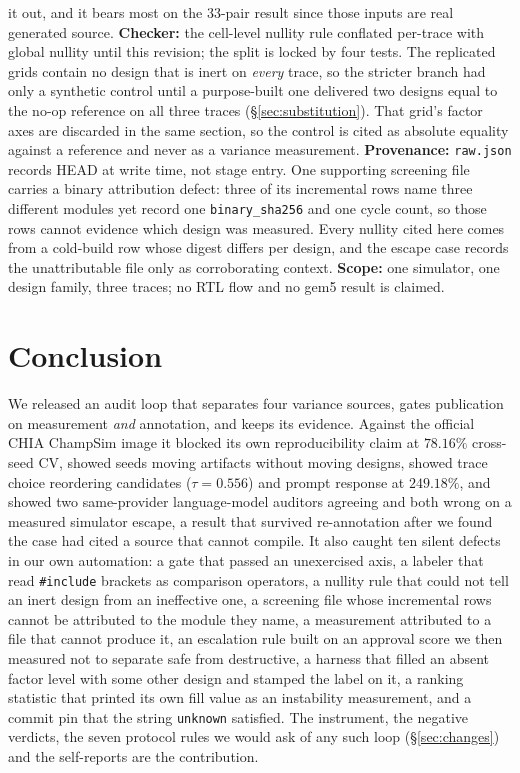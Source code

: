 \documentclass[10pt,twocolumn]{article}
\begin{document}
it out, and it bears most on the 33-pair result since those inputs are real generated
source. \textbf{Checker:} the
cell-level nullity rule conflated per-trace with global nullity until this revision;
the split is locked by four tests. The replicated grids contain no design that is inert
on \emph{every} trace, so the stricter branch had only a synthetic control until a
purpose-built one delivered two designs equal to the no-op reference on all three
traces (\S\ref{sec:substitution}). That grid's factor axes are discarded in the same
section, so the control is cited as absolute equality against a reference and never as
a variance measurement.
\textbf{Provenance:} \texttt{raw.json} records HEAD at write time, not stage entry.
One supporting screening file carries a binary attribution defect: three of its
incremental rows name three different modules yet record one \texttt{binary\_sha256}
and one cycle count, so those rows cannot evidence which design was measured. Every
nullity cited here comes from a cold-build row whose digest differs per design, and
the escape case records the unattributable file only as corroborating context.
\textbf{Scope:} one simulator, one design
family, three traces; no RTL flow and no gem5 result is claimed.

\section{Conclusion}
We released an audit loop that separates four variance sources, gates publication
on measurement \emph{and} annotation, and keeps its evidence. Against the
official CHIA ChampSim image it blocked its own reproducibility claim at
$78.16\%$ cross-seed CV, showed seeds moving artifacts without moving designs,
showed trace choice reordering candidates ($\tau=0.556$) and prompt response at
$249.18\%$, and showed two same-provider language-model auditors agreeing and both
wrong on a measured simulator escape, a result that survived re-annotation after we
found the case had cited a source that cannot compile. It also caught ten silent defects
in our own automation: a gate that passed an unexercised axis, a labeler that read
\texttt{\#include} brackets as comparison operators, a nullity rule that could not tell
an inert design from an ineffective one, a screening file whose incremental rows cannot
be attributed to the module they name, a measurement attributed to a file that cannot
produce it, an escalation rule built on an approval score we then measured not to
separate safe from destructive, a harness that filled an absent factor level with
some other design and stamped the label on it, a ranking statistic that printed its own
fill value as an instability measurement, and a commit pin that the string
\texttt{unknown} satisfied.
The instrument, the negative verdicts, the seven protocol rules we would ask of any
such loop (\S\ref{sec:changes}) and the self-reports are the contribution.
\end{document}
